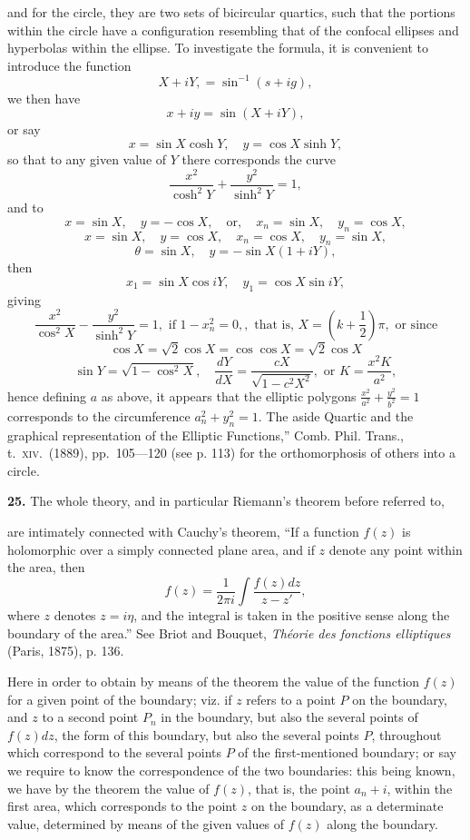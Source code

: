 \documentclass[11pt,a4paper]{book}
\begin{document}
and for the circle, they are two sets of bicircular quartics, such that the portions within the circle have a configuration resembling that of the confocal ellipses and hyperbolas within the ellipse. To investigate the formula, it is convenient to introduce the function
\[
X + iY, = \sin^{-1}(s + ig),
\]
we then have
\[
x + iy = \sin (X + iY),
\]
or say
\[
x = \sin X \cosh Y, \quad y = \cos X \sinh Y,
\]
so that to any given value of $Y$ there corresponds the curve
\[
\frac{x^2}{\cosh^2 Y} + \frac{y^2}{\sinh^2 Y} = 1,
\]
and to
\[
x = \sin X, \quad y = -\cos X, \quad \text{or}, \quad x_n = \sin X, \quad y_n = \cos X,
\]
\[
x = \sin X, \quad y = \cos X, \quad x_n = \cos X, \quad y_n = \sin X,
\]
\[
\theta = \sin X, \quad y = -\sin X (1 + iY),
\]
then
\[
x_1 = \sin X \cos iY, \quad y_1 = \cos X \sin iY,
\]
giving
\[
\frac{x^2}{\cos^2 X} - \frac{y^2}{\sinh^2 Y} = 1, \text{ if } 1 - x_n^2 = 0,, \text{ that is, } X = (k + \frac{1}{2})\pi, \text{ or since}
\]
\[
\cos X = \sqrt{2} \cos X = \cos \cos X = \sqrt{2} \cos X
\]
\[
\sin Y = \sqrt{1 - \cos^2 X}, \quad \frac{dY}{dX} = \frac{c X}{\sqrt{1 - c^2 X^2}}, \text{ or } K = \frac{x^2 K}{a^2},
\]
hence defining $a$ as above, it appears that the elliptic polygons $\frac{x^2}{a^2} + \frac{y^2}{b^2} = 1$ corresponds to the circumference $a_n^2 + y_n^2 = 1$. The aside Quartic and the graphical representation of the Elliptic Functions,'' Comb. Phil. Trans., t.\ \textsc{xiv}.\ (1889), pp.\ 105---120 (see p. 113) for the orthomorphosis of others into a circle.

\textbf{25.} The whole theory, and in particular Riemann's theorem before referred to,

are intimately connected with Cauchy's theorem, ``If a function $f(z)$ is holomorphic over a simply connected plane area, and if $z$ denote any point within the area, then
\[
f(z) = \frac{1}{2\pi i} \int \frac{f(z) dz}{z - z'},
\]
where $z$ denotes $z = i\eta$, and the integral is taken in the positive sense along the boundary of the area.'' See Briot and Bouquet, \textit{Th\'{e}orie des fonctions elliptiques} (Paris, 1875), p. 136.

Here in order to obtain by means of the theorem the value of the function $f(z)$ for a given point of the boundary; viz. if $z$ refers to a point $P$ on the boundary, and $z$ to a second point $P_n$ in the boundary, but also the several points of $f(z) dz$, the form of this boundary, but also the several points $P$, throughout which correspond to the several points $P$ of the first-mentioned boundary; or say we require to know the correspondence of the two boundaries: this being known, we have by the theorem the value of $f(z)$, that is, the point $a_n + i$, within the first area, which corresponds to the point $z$ on the boundary, as a determinate value, determined by means of the given values of $f(z)$ along the boundary.
\end{document}
